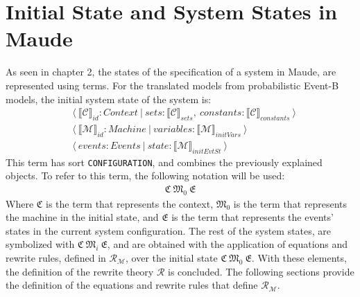 \section{Initial State and System States in Maude}
As seen in chapter 2, the states of the specification of a system in Maude, are represented using terms. For the translated models from probabilistic Event-B models, the initial system state of the system is:
\begin{align*}
        &\langle \ \llbracket \mathscr{C} \rrbracket_{id} : Context \ | \ sets: \llbracket \mathscr{C} \rrbracket_{sets} , \ constants: \llbracket \mathscr{C} \rrbracket_{constants} \ \rangle \\
        & \langle \ \llbracket \mathscr{M} \rrbracket_{id} : Machine \ | \ variables: \llbracket \mathscr{M} \rrbracket_{initVars} \ \rangle \\
        & \langle \ events : Events \ | \ state :  \llbracket \mathscr{M} \rrbracket_{initEvtSt}  \ \rangle
\end{align*}
This term has sort \texttt{CONFIGURATION}, and combines the previously explained objects. To refer to this term, the following notation will be used:
    \begin{align*}
        \mathfrak{C} \ \mathfrak{M}_{0}  \ \mathfrak{E}
    \end{align*}
Where $\mathfrak{C}$ is the term that represents the context, $\mathfrak{M}_{0}$ is the term that represents the machine in the initial state, and $\mathfrak{E}$ is the term that represents the events' states in the current system configuration. The rest of the system states, are symbolized with $\mathfrak{C} \ \mathfrak{M}_{i}  \ \mathfrak{E}$, and are obtained with the application of equations and rewrite rules, defined in $\mathscr{R}_\mathscr{M}$,  over the initial state $\mathfrak{C} \ \mathfrak{M}_{0}  \ \mathfrak{E}$. With these elements, the definition of the rewrite theory $\mathscr{R}$ is concluded. The following sections provide the definition of the equations and rewrite rules that define $\mathscr{R}_\mathscr{M}$.


